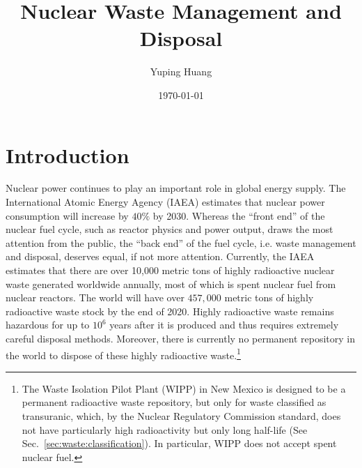 \documentclass[nofootinbib,preprint,aps]{revtex4-1}
\begin{document}
\title{Nuclear Waste Management and Disposal}

\author{Yuping Huang}%

\date{\today}%
\begin{abstract}
\end{abstract}
\maketitle
\tableofcontents
\newpage
\section{Introduction}
Nuclear power continues to play an important role in global energy supply.
The International Atomic Energy Agency (IAEA) estimates that nuclear power
consumption will increase by $40\%$ by 2030.\cite{iaea12}
Whereas the ``front end'' of the nuclear fuel cycle, such as reactor physics and power output, draws
the most attention from the public, the ``back end'' of the fuel cycle, i.e. waste management and
disposal, deserves equal, if not more attention.
Currently, the IAEA estimates that there are over 10,000 metric tons of highly radioactive nuclear waste 
generated worldwide annually,
most of which is spent nuclear fuel from nuclear reactors.\cite{iaea08, r12}
The world will have over $457,000$ metric tons of highly radioactive waste stock by the end of 2020.\cite{r12}
Highly radioactive waste remains hazardous for up to $10^6$ years after it is produced and thus
requires extremely careful disposal methods.
Moreover, there is currently no permanent repository in the world to dispose of these highly radioactive
waste.\footnote{The Waste Isolation Pilot Plant (WIPP) in New Mexico is designed to be a permanent radioactive
    waste repository, but only
for waste classified as transuranic, which, by the Nuclear Regulatory Commission standard, does not have particularly
high radioactivity but only long half-life (See Sec.~\ref{sec:waste:classification}). In particular, WIPP does not accept spent nuclear
fuel.}  
\end{document}
